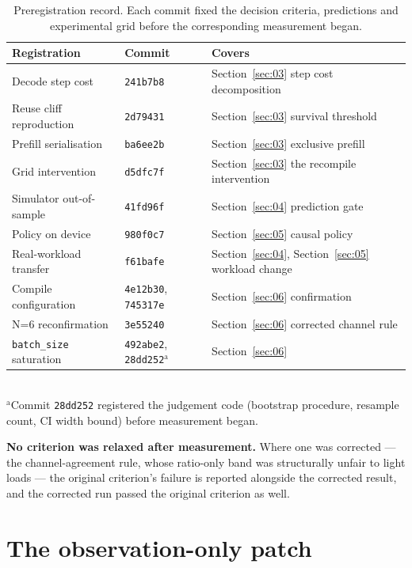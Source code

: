 \begin{table}[t]
  \centering
  \caption{Preregistration record. Each commit fixed the decision criteria, predictions and experimental grid before the corresponding measurement began.}
  \footnotesize
  \begin{tabular}{p{2.2cm}p{2.35cm}p{2.7cm}}
    \toprule
    Registration & Commit & Covers \\
    \midrule
    Decode step cost & \texttt{241b7b8} & Section~\ref{sec:03} step cost decomposition \\
    Reuse cliff reproduction & \texttt{2d79431} & Section~\ref{sec:03} survival threshold \\
    Prefill serialisation & \texttt{ba6ee2b} & Section~\ref{sec:03} exclusive prefill \\
    Grid intervention & \texttt{d5dfc7f} & Section~\ref{sec:03} the recompile intervention \\
    Simulator out-of-sample & \texttt{41fd96f} & Section~\ref{sec:04} prediction gate \\
    Policy on device & \texttt{980f0c7} & Section~\ref{sec:05} causal policy \\
    Real-workload transfer & \texttt{f61bafe} & Section~\ref{sec:04}, Section~\ref{sec:05} workload change \\
    Compile configuration & \texttt{4e12b30}, \texttt{745317e} & Section~\ref{sec:06} confirmation \\
    N=6 reconfirmation & \texttt{3e55240} & Section~\ref{sec:06} corrected channel rule \\
    \texttt{batch\_size} saturation & \texttt{492abe2}, \texttt{28dd252}$^{\mathrm{a}}$ & Section~\ref{sec:06} \\
    \bottomrule
  \end{tabular}
  \\[2pt]{\footnotesize $^{\mathrm{a}}$Commit \texttt{28dd252} registered the judgement code (bootstrap procedure, resample count, CI width bound) before measurement began.}
\end{table}

\textbf{No criterion was relaxed after measurement.} Where one was corrected --- the channel-agreement rule, whose ratio-only band was structurally unfair to light loads --- the original criterion's failure is reported alongside the corrected result, and the corrected run passed the original criterion as well.

\section{The observation-only patch}

